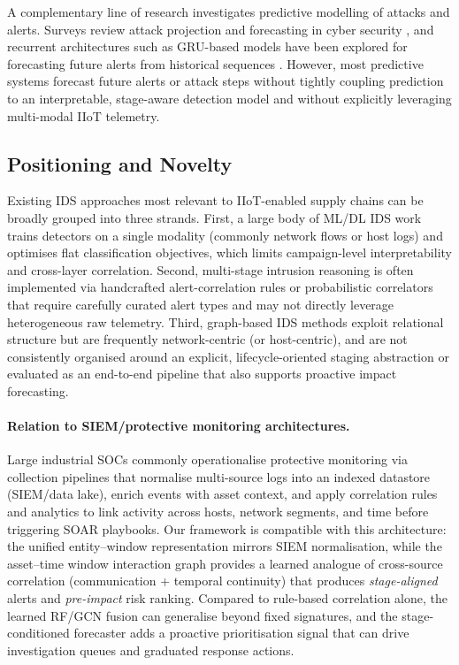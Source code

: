 \documentclass[pdflatex,sn-mathphys-num]{sn-jnl}
\theoremstyle{thmstyleone}%
\theoremstyle{thmstyletwo}%
\theoremstyle{thmstylethree}%
\begin{document}
A complementary line of research investigates predictive modelling of attacks and alerts. Surveys review attack projection and forecasting in cyber security \cite{husak2019surveyPredict,sun2018cyberIncidentPrediction,albasheer2022_cyberattackPredictionSurvey}, and recurrent architectures such as GRU-based models have been explored for forecasting future alerts from historical sequences \cite{ansari2022_gruAlertPrediction}. However, most predictive systems forecast future alerts or attack steps without tightly coupling prediction to an interpretable, stage-aware detection model and without explicitly leveraging multi-modal IIoT telemetry.

\subsection{Positioning and Novelty}

Existing IDS approaches most relevant to IIoT-enabled supply chains can be broadly grouped into three strands. First, a large body of ML/DL IDS work trains detectors on a single modality (commonly network flows or host logs) and optimises flat classification objectives, which limits campaign-level interpretability and cross-layer correlation. Second, multi-stage intrusion reasoning is often implemented via handcrafted alert-correlation rules or probabilistic correlators that require carefully curated alert types and may not directly leverage heterogeneous raw telemetry. Third, graph-based IDS methods exploit relational structure but are frequently network-centric (or host-centric), and are not consistently organised around an explicit, lifecycle-oriented staging abstraction or evaluated as an end-to-end pipeline that also supports proactive impact forecasting.

\paragraph{Relation to SIEM/protective monitoring architectures.}
Large industrial SOCs commonly operationalise protective monitoring via collection pipelines that normalise multi-source logs into an indexed datastore (SIEM/data lake), enrich events with asset context, and apply correlation rules and analytics to link activity across hosts, network segments, and time before triggering SOAR playbooks.
Our framework is compatible with this architecture: the unified entity--window representation mirrors SIEM normalisation, while the asset--time window interaction graph provides a learned analogue of cross-source correlation (communication + temporal continuity) that produces \emph{stage-aligned} alerts and \emph{pre-impact} risk ranking.
Compared to rule-based correlation alone, the learned RF/GCN fusion can generalise beyond fixed signatures, and the stage-conditioned forecaster adds a proactive prioritisation signal that can drive investigation queues and graduated response actions.
\end{document}

